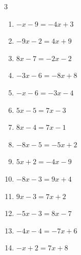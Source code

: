 \begin{multicols}{3}
\begin{enumerate}
  \item $-x-9=-4x+3$

        \phantom{$\displaystyle x=4$}

  \item $-9x-2=4x+9$


  \item $8x-7=-2x-2$


\columnbreak %

\resetques

  \item $-3x-6=-8x+8$


  \item $-x-6=-3x-4$

        \phantom{$\displaystyle x=1$}

  \item $5x-5=7x-3$

        \phantom{$\displaystyle x=-1$}

  \item $8x-4=7x-1$

        \phantom{$\displaystyle x=3$}

  \item $-8x-5=-5x+2$


  \item $5x+2=-4x-9$


  \item $-8x-3=9x+4$


  \item $9x-3=7x+2$


  \item $-5x-3=8x-7$


  \item $-4x-4=-7x+6$


  \item $-x+2=7x+8$


\end{enumerate}
\end{multicols}
